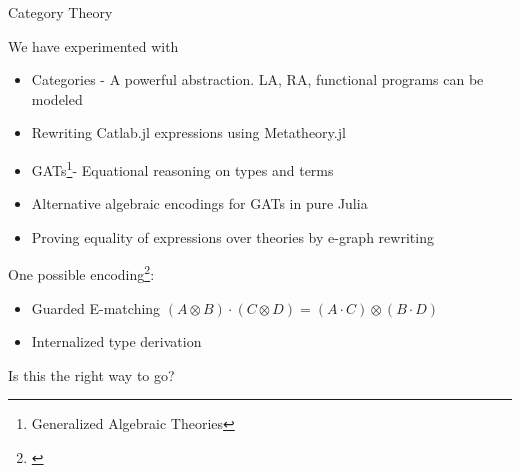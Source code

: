 \documentclass[8pt]{beamer}  %
\newcommand{\MYhref}[3][blue]{\href{#2}{\color{#1}{#3}}}%
\begin{document}
\begin{frame}{Category Theory}

We have experimented with

\begin{itemize}
    \item Categories - A powerful abstraction. LA, RA, functional programs can be modeled
    \item Rewriting Catlab.jl expressions using Metatheory.jl
    \item GATs\footnote{Generalized Algebraic Theories}-  Equational reasoning on types and terms
    
    \item Alternative algebraic encodings for GATs in pure Julia
    \item Proving equality of expressions over theories by e-graph rewriting
\end{itemize}
One possible encoding\footnote{\MYhref{https://www.philipzucker.com/metatheory-progress/}{https://www.philipzucker.com/metatheory-progress/}}:

\begin{itemize}
    \item Guarded E-matching $(A \otimes B) \cdot (C \otimes D) = (A \cdot C) \otimes (B \cdot D)$
    \item Internalized type derivation
    \end{itemize}
    
Is this the right way to go?





\end{frame}

\end{document}

